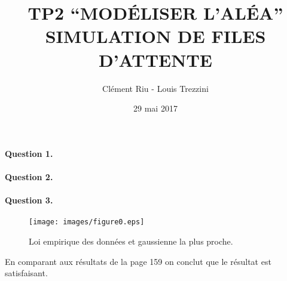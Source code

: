 \documentclass[12pt,a4paper]{article}
\title{\textbf{TP2 “MODÉLISER L’ALÉA” \\ SIMULATION DE FILES D'ATTENTE}}
\author{Clément Riu - Louis Trezzini}
\date{29 mai 2017}
\begin{document}
\maketitle

\paragraph*{Question 1.}

\paragraph*{Question 2.}

\paragraph*{Question 3.}

\begin{figure}[H]
	\centering
	\texttt{[image: images/figure0.eps]}
	\caption{Loi empirique des données et gaussienne la plus proche.}
\end{figure}

En comparant aux résultats de la page 159 on conclut que le résultat est satisfaisant.
\end{document}
